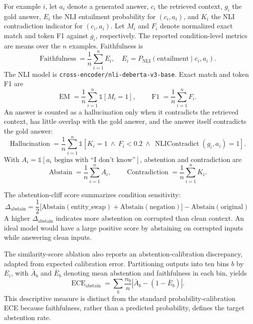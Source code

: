 \documentclass[11pt]{article}
\begin{document}
For example $i$, let $a_i$ denote a generated answer, $c_i$ the retrieved context,
$g_i$ the gold answer, $E_i$ the NLI entailment probability for $(c_i,a_i)$, and $K_i$
the NLI contradiction indicator for $(c_i,a_i)$. Let $M_i$ and $F_i$ denote normalized
exact match and token F1 against $g_i$, respectively. The reported condition-level
metrics are means over the $n$ examples. Faithfulness is
\begin{equation}
  \operatorname{Faithfulness} = \frac{1}{n}\sum_{i=1}^{n} E_i,
  \quad E_i = P_\text{NLI}(\text{entailment}\mid c_i,a_i).
  \label{eq:faithfulness}
\end{equation}
The NLI model is \texttt{cross-encoder/nli-deberta-v3-base}. Exact match and token F1 are
\begin{equation}
  \operatorname{EM}=\frac{1}{n}\sum_{i=1}^{n}\mathbb{1}[M_i=1],
  \qquad
  \operatorname{F1}=\frac{1}{n}\sum_{i=1}^{n}F_i.
  \label{eq:answer-quality}
\end{equation}
An answer is counted as a hallucination only when it contradicts the retrieved context,
has little overlap with the gold answer, and the answer itself contradicts the gold answer:
\begin{equation}
  \operatorname{Hallucination} = \frac{1}{n}\sum_{i=1}^{n}
  \mathbb{1}[K_i=1\ \land\ F_i<0.2\ \land\ \operatorname{NLIContradict}(g_i,a_i)=1].
  \label{eq:hallucination}
\end{equation}
With $A_i=\mathbb{1}[a_i\text{ begins with ``I don't know''}]$, abstention and
contradiction are
\begin{equation}
  \operatorname{Abstain}=\frac{1}{n}\sum_{i=1}^{n}A_i,
  \qquad
  \operatorname{Contradiction}=\frac{1}{n}\sum_{i=1}^{n}K_i.
  \label{eq:abstention-contradiction}
\end{equation}

The abstention-cliff score summarizes condition sensitivity:
\begin{equation}
  \Delta_\text{abstain} = \frac{1}{2}
    \bigl[\text{Abstain}(\text{entity\_swap}) + \text{Abstain}(\text{negation})\bigr]
    - \text{Abstain}(\text{original})
  \label{eq:cliff}
\end{equation}
A higher $\Delta_\text{abstain}$ indicates more abstention on corrupted than clean context.
An ideal model would have a large positive score by abstaining on corrupted inputs while
answering clean inputs.

The similarity-score ablation also reports an abstention-calibration discrepancy, adapted
from expected calibration error. Partitioning outputs into ten bins $b$ by $E_i$, with
$\bar{A}_b$ and $\bar{E}_b$ denoting mean abstention and faithfulness in each bin, yields
\begin{equation}
  \operatorname{ECE}_{\mathrm{abstain}} = \sum_b \frac{n_b}{n}
  \left|\bar{A}_b-(1-\bar{E}_b)\right|.
  \label{eq:ece}
\end{equation}
This descriptive measure is distinct from the standard probability-calibration ECE because
faithfulness, rather than a predicted probability, defines the target abstention rate.
\end{document}
